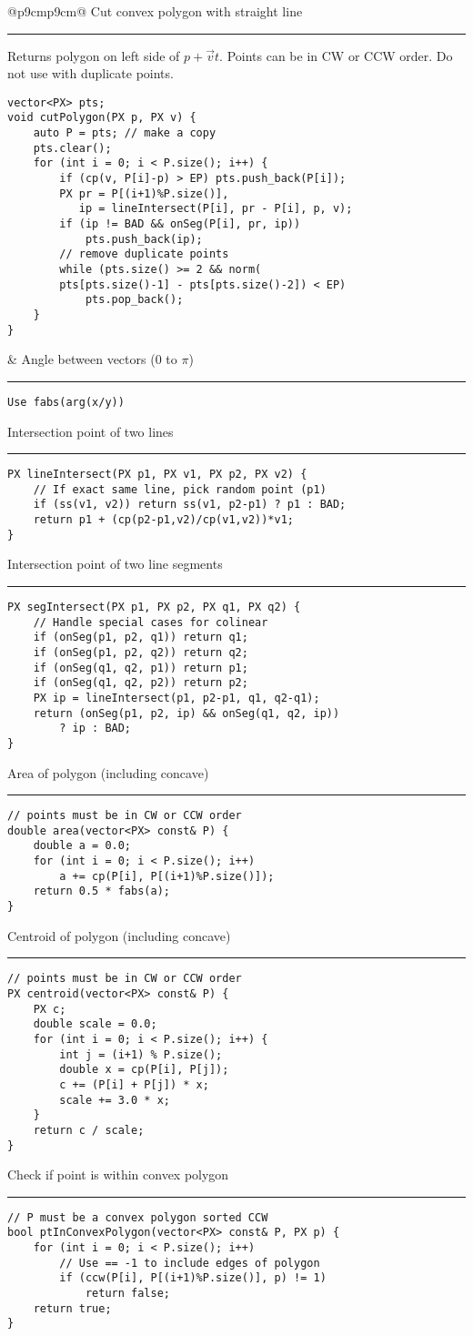 \documentclass[letterpaper]{article}
\newcommand{\rx}[1]{#1\hrule}
\begin{document}
\begin{tabular}{@{}p{9cm}p{9cm}@{}}
\rx{Cut convex polygon with straight line}
\vspace{1mm}
Returns polygon on left side of $p+\vec vt$. Points can be in CW or CCW order. Do not use with duplicate points.
\begin{lstlisting}
vector<PX> pts;
void cutPolygon(PX p, PX v) {
	auto P = pts; // make a copy
	pts.clear();
	for (int i = 0; i < P.size(); i++) {
		if (cp(v, P[i]-p) > EP) pts.push_back(P[i]);
		PX pr = P[(i+1)%P.size()],
		   ip = lineIntersect(P[i], pr - P[i], p, v);
		if (ip != BAD && onSeg(P[i], pr, ip))
			pts.push_back(ip);
		// remove duplicate points
		while (pts.size() >= 2 && norm(
		pts[pts.size()-1] - pts[pts.size()-2]) < EP)
			pts.pop_back();
	}
}
\end{lstlisting}
&
\rx{Angle between vectors ($0$ to $\pi$)}
\begin{lstlisting}
Use fabs(arg(x/y))
\end{lstlisting}
\rx{Intersection point of two lines}
\begin{lstlisting}
PX lineIntersect(PX p1, PX v1, PX p2, PX v2) {
	// If exact same line, pick random point (p1)
	if (ss(v1, v2)) return ss(v1, p2-p1) ? p1 : BAD; 
	return p1 + (cp(p2-p1,v2)/cp(v1,v2))*v1;
}
\end{lstlisting}
\rx{Intersection point of two line segments}
\begin{lstlisting}
PX segIntersect(PX p1, PX p2, PX q1, PX q2) {
	// Handle special cases for colinear
	if (onSeg(p1, p2, q1)) return q1;
	if (onSeg(p1, p2, q2)) return q2;
	if (onSeg(q1, q2, p1)) return p1;
	if (onSeg(q1, q2, p2)) return p2;
	PX ip = lineIntersect(p1, p2-p1, q1, q2-q1);
	return (onSeg(p1, p2, ip) && onSeg(q1, q2, ip))
		? ip : BAD;
}
\end{lstlisting}
\rx{Area of polygon (including concave)}
\begin{lstlisting}
// points must be in CW or CCW order
double area(vector<PX> const& P) {
	double a = 0.0;
	for (int i = 0; i < P.size(); i++)
		a += cp(P[i], P[(i+1)%P.size()]);
	return 0.5 * fabs(a);
}
\end{lstlisting}
\rx{Centroid of polygon (including concave)}
\begin{lstlisting}
// points must be in CW or CCW order
PX centroid(vector<PX> const& P) {
	PX c;
	double scale = 0.0;
	for (int i = 0; i < P.size(); i++) {
		int j = (i+1) % P.size();
		double x = cp(P[i], P[j]);
		c += (P[i] + P[j]) * x;
		scale += 3.0 * x;
	}
	return c / scale;
}
\end{lstlisting}
\rx{Check if point is within convex polygon}
\begin{lstlisting}
// P must be a convex polygon sorted CCW
bool ptInConvexPolygon(vector<PX> const& P, PX p) {
	for (int i = 0; i < P.size(); i++)
		// Use == -1 to include edges of polygon
		if (ccw(P[i], P[(i+1)%P.size()], p) != 1)
			return false;
	return true;
}
\end{lstlisting}
\end{tabular}
\end{document}
